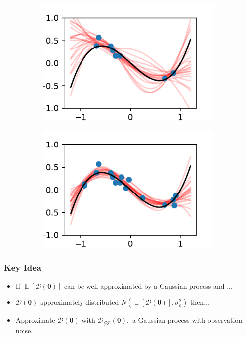 \documentclass{beamer}
\DeclareMathOperator{\E}{\mathbb{E}}
\begin{document}
\begin{frame}
\begin{figure}
\begin{subfigure}[t]{0.4\textwidth}
            \includegraphics[width=\textwidth]{cub_GP_err_8_iters.pdf}
        \end{subfigure}%
        \begin{subfigure}[t]{0.4\textwidth}
            \centering
            \includegraphics[width=\textwidth]{cub_GP_err_16_iters.pdf}
        \end{subfigure}%
    \end{figure}
\end{frame}

\begin{frame}
    \frametitle{Key Idea}
    \begin{itemize}
        \item If $\E[\mathcal{D}(\bm{\theta})]$ can be well approximated by a
              Gaussian process and ...
        \item <2-> $\mathcal{D}(\bm{\theta})$ approximately distributed
              $N(\E[\mathcal{D}(\bm{\theta})], \sigma^2_o)$ then...
        \item <3-> Approximate $\mathcal{D}(\bm{\theta})$ with
              $\mathcal{D}_\mathcal{GP}(\bm{\theta}),$ a Gaussian process with
              observation noise.
    \end{itemize}
\end{frame}
\end{document}
